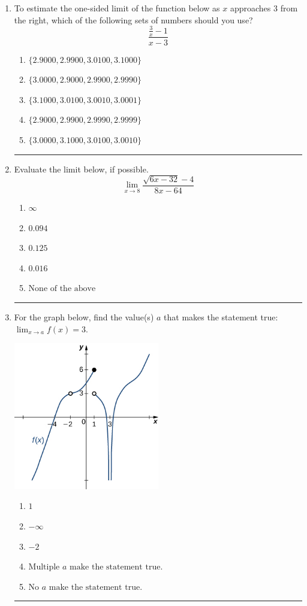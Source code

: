 \documentclass[14pt]{extbook}
\newcommand{\litem}[1]{\item#1\hspace*{-1cm}\rule{\textwidth}{0.4pt}}
\begin{document}
\begin{enumerate}
{\begin{enumerate}[label=\Alph*.]
\end{enumerate} }
\litem{
To estimate the one-sided limit of the function below as $x$ approaches 3 from the right, which of the following sets of numbers should you use?\[ \frac{\frac{3}{x} - 1}{x - 3} \]\begin{enumerate}[label=\Alph*.]
\item \( \{ 2.9000, 2.9900, 3.0100, 3.1000 \} \)
\item \( \{ 3.0000, 2.9000, 2.9900, 2.9990 \} \)
\item \( \{ 3.1000, 3.0100, 3.0010, 3.0001 \} \)
\item \( \{ 2.9000, 2.9900, 2.9990, 2.9999 \} \)
\item \( \{ 3.0000, 3.1000, 3.0100, 3.0010 \} \)

\end{enumerate} }
\litem{
Evaluate the limit below, if possible.\[ \lim_{x \rightarrow 8} \frac{\sqrt{6x - 32} - 4}{8x - 64} \]\begin{enumerate}[label=\Alph*.]
\item \( \infty \)
\item \( 0.094 \)
\item \( 0.125 \)
\item \( 0.016 \)
\item \( \text{None of the above} \)

\end{enumerate} }
\litem{
For the graph below, find the value(s) $a$ that makes the statement true: $ \displaystyle \lim_{x \rightarrow a} f(x) = 3$.
\begin{center}
    \includegraphics[width=0.5\textwidth]{../Figures/evaluateLimitGraphicallyA.png}
\end{center}
\begin{enumerate}[label=\Alph*.]
\item \( 1 \)
\item \( -\infty \)
\item \( -2 \)
\item \( \text{Multiple } a \text{ make the statement true}. \)
\item \( \text{No } a \text{ make the statement true}. \)


\end{enumerate}}
\end{enumerate}
\end{document}
